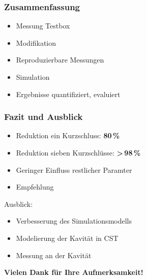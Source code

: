 \documentclass[accentcolor=tud9b, colorbacktitle, inverttitle]{tudbeamer}
\begin{document}
\begin{frame}\frametitle{Zusammenfassung}
\begin{itemize}
	\item Messung Testbox
	\item Modifikation 
	\item Reproduzierbare Messungen
	\item Simulation
	\item Ergebnisse quantifiziert, evaluiert
\end{itemize}
\end{frame}


\begin{frame}\frametitle{Fazit und Ausblick}
\begin{itemize}
	\item Reduktion ein Kurzschluss: \textbf{80\,\%}
	\item Reduktion sieben Kurzschl\"usse:  \textbf{>\,98\,\%}
	\item Geringer Einfluss restlicher Paramter
	\item Empfehlung
\end{itemize}
Ausblick:
\begin{itemize}
	\item Verbesserung des Simulationsmodells
	\item Modelierung der Kavit\"at in CST
	\item Messung an der Kavit\"at
\end{itemize}
\end{frame}


\begin{frame}
\vspace{2cm}\hspace{2cm}
{\Large\bf Vielen Dank für Ihre Aufmerksamkeit!}
\end{frame}
% 	 
\end{document}
